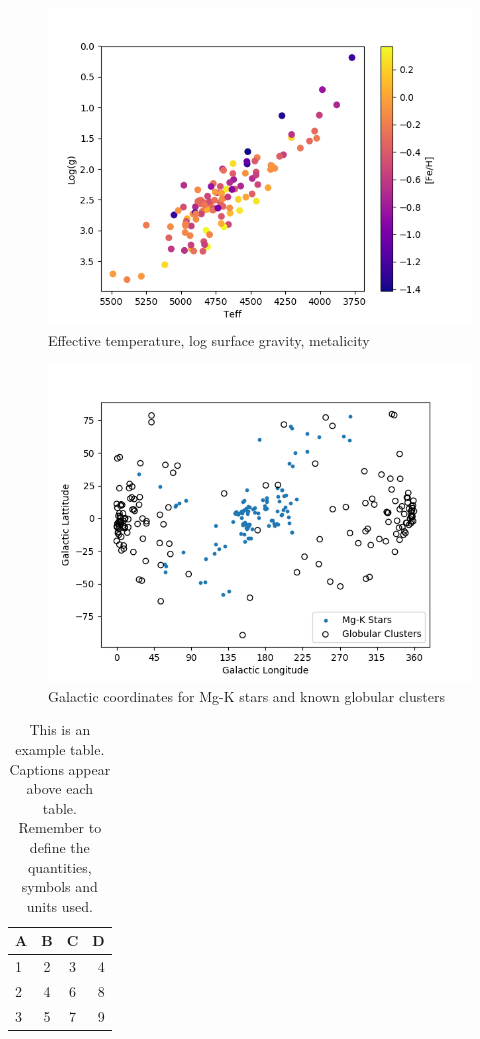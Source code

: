 \documentclass[a4paper,fleqn,usenatbib]{mnras}
\begin{document}
\begin{figure}
	\includegraphics[width=\columnwidth]{loggteffof113.png}
    \caption{Effective temperature, log surface gravity, metalicity}
    \label{mhist}
\end{figure}

\begin{figure}
	\includegraphics[width=\columnwidth]{globclustof113.png}
    \caption{Galactic coordinates for Mg-K stars and known globular clusters}
    \label{mhist}
\end{figure}

\begin{table}
	\centering
	\caption{This is an example table. Captions appear above each table.
	Remember to define the quantities, symbols and units used.}
	\label{tab:example_table}
	\begin{tabular}{lccr} %
		\hline
		A & B & C & D\\
		\hline
		1 & 2 & 3 & 4\\
		2 & 4 & 6 & 8\\
		3 & 5 & 7 & 9\\
		\hline
	\end{tabular}
\end{table}
\end{document}
